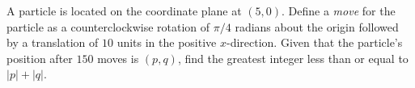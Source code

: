 A particle is located on the coordinate plane at $ (5,0)$. Define a \textit{move} for the particle as a counterclockwise rotation of $ \pi/4$ radians about the origin followed by a translation of $ 10$ units in the positive $ x$-direction. Given that the particle's position after $ 150$ moves is $ (p,q)$, find the greatest integer less than or equal to $ |p|+|q|$.